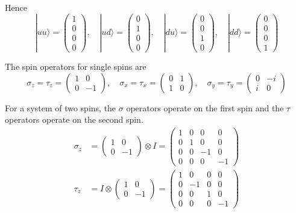 Hence
\begin{equation*}
|uu\rangle=\begin{pmatrix}1\\0\\0\\0\end{pmatrix},
\quad
|ud\rangle=\begin{pmatrix}0\\1\\0\\0\end{pmatrix},
\quad
|du\rangle=\begin{pmatrix}0\\0\\1\\0\end{pmatrix},
\quad
|dd\rangle=\begin{pmatrix}0\\0\\0\\1\end{pmatrix}
\end{equation*}

The spin operators for single spins are
\begin{equation*}
\sigma_z=\tau_z=\begin{pmatrix}1&0\\0&-1\end{pmatrix},
\quad
\sigma_x=\tau_x=\begin{pmatrix}0&1\\1&0\end{pmatrix},
\quad
\sigma_y=\tau_y=\begin{pmatrix}0&-i\\i&0\end{pmatrix}
\end{equation*}

For a system of two spins, the $\sigma$ operators operate on the first spin
and the $\tau$ operators operate on the second spin.
\begin{align*}
\sigma_z&=\begin{pmatrix}1&0\\0&-1\end{pmatrix}\otimes I
=\begin{pmatrix}1&0&0&0\\0&1&0&0\\0&0&-1&0\\0&0&0&-1\end{pmatrix}
\\[1ex]
\tau_z&=I\otimes\begin{pmatrix}1&0\\0&-1\end{pmatrix}
=\begin{pmatrix}1&0&0&0\\0&-1&0&0\\0&0&1&0\\0&0&0&-1\end{pmatrix}
\end{align*}



